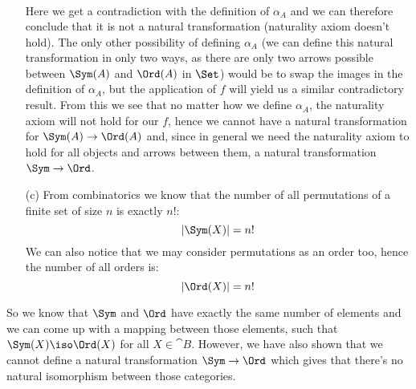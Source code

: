 \begin{answer}
\begin{itemize}
\begin{align*}
      \end{align*}
      Here we get a contradiction with the definition of $\alpha_A$ and we can
      therefore conclude that it is not a natural transformation (naturality
      axiom doesn't hold). The only other possibility of defining $\alpha_A$
      (we can define this natural transformation in only two ways, as there are
      only two arrows possible between $\Sym(A)$ and $\Ord(A)$ in $\Set$) would
      be to swap the images in the definition of $\alpha_A$, but the
      application of $f$ will yield us a similar contradictory result. From
      this we see that no matter how we define $\alpha_A$, the naturality axiom
      will not hold for our $f$, hence we cannot have a natural transformation
      for $\Sym(A) \to \Ord(A)$ and, since in general we need the naturality
      axiom to hold for all objects and arrows between them, a natural
      transformation $\Sym \to \Ord$.
    \item[(c)]
      From combinatorics we know that the number of all permutations of a
      finite set of size $n$ is exactly $n$!:\\
      \begin{equation*}
        |\Sym(X)| = n!
      \end{equation*}
      We can also notice that we may consider permutations as an order too,
      hence the number of all orders is:
      \begin{equation*}
        |\Ord(X)| = n!
      \end{equation*}
  \end{itemize}
  So we know that $\Sym$ and $\Ord$ have exactly the same number of elements
  and we can come up with a mapping between those elements, such that $\Sym(X)
  \iso \Ord(X)$ for all $X \in \cat{B}$. However, we have also shown that we
  cannot define a natural transformation $\Sym \to \Ord$ which gives that
  there's no natural isomorphism between those categories.
\end{answer}


